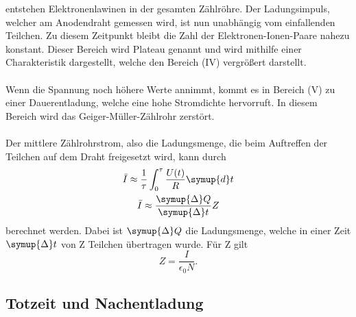     entstehen Elektronenlawinen in der gesamten Zählröhre. 
    Der Ladungsimpuls, welcher am Anodendraht gemessen wird, ist nun unabhängig vom einfallenden Teilchen.
    Zu diesem Zeitpunkt bleibt die Zahl der Elektronen-Ionen-Paare nahezu konstant.
    Dieser Bereich wird Plateau genannt und wird mithilfe einer Charakteristik dargestellt,
    welche den Bereich (IV) vergrößert darstellt. \\ 
    \\
    Wenn die Spannung noch höhere Werte annimmt, kommt es in Bereich (V) zu einer Dauerentladung,
    welche eine hohe Stromdichte hervorruft. In diesem Bereich wird das Geiger-Müller-Zählrohr zerstört.\\
    \\
    Der mittlere Zählrohrstrom, also die Ladungsmenge, die beim Auftreffen der Teilchen auf 
    dem Draht freigesetzt wird, kann durch
    \begin{gather}
        \bar{I} \approx \frac{1}{\tau} \int_0^{\tau}{\frac{U(t)}{R}} \symup{d}t \\
        \bar{I} \approx \frac{\symup{\Delta}Q}{\symup{\Delta}t} Z
    \end{gather}
    berechnet werden.
    Dabei ist $\symup{\Delta}Q$ die Ladungsmenge, welche in einer Zeit $\symup{\Delta}t$ von Z
    Teilchen übertragen wurde.
    Für Z gilt 
    \begin{equation}
        Z = \frac{I}{\epsilon_0 N} . \label{eqn:Teilchenzahl}
    \end{equation}

\subsection{Totzeit und Nachentladung}

